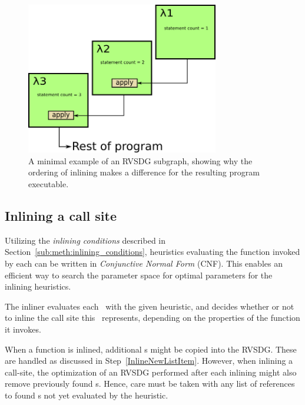 \begin{figure}[H]
	\centering
	\includegraphics[width=0.75\textwidth]{figures/inline_ordering_ex}
	\caption{A minimal example of an RVSDG subgraph, showing why the ordering of
inlining makes a difference for the resulting program executable.}
	\label{fig:inline_ordering_ex}
\end{figure}

\subsection{Inlining a call site}
\label{sub:scheme:inlining_apply_nodes}

Utilizing the \textit{inlining conditions} described in
Section~\ref{sub:meth:inlining_conditions}, heuristics evaluating the function
invoked by each \applyNode can be written in \textit{Conjunctive Normal Form}
(CNF). This enables an efficient way to search the parameter space for optimal
parameters for the inlining heuristics.

The inliner evaluates each \applyNode~with the given heuristic, and decides
whether or not to inline the call site this \applyNode~represents, depending on
the properties of the function it invokes.



When a function is inlined, additional \applyNode s might be copied into the
RVSDG. These are handled as discussed in Step~\ref{InlineNewListItem}. However,
when inlining a call-site, the optimization of an RVSDG performed after each
inlining might also remove previously found \applyNode s. Hence, care must be
taken with any list of references to found \applyNode s not yet evaluated by the
heuristic.

